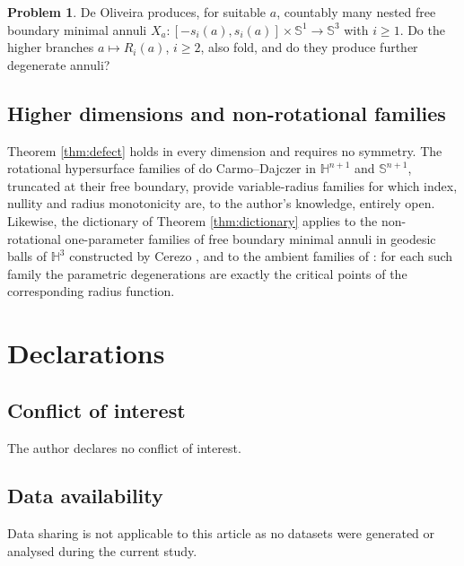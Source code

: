 \documentclass[11pt,a4paper]{amsart}
\theoremstyle{plain}
\theoremstyle{definition}
\newtheorem{problem}[theorem]{Problem}
\newcommand{\Sph}{\mathbb{S}}
\newcommand{\Hyp}{\mathbb{H}}
\begin{document}
\begin{problem}\label{prob:otherbranches}
De Oliveira \cite[Thm. 3.2]{dO24} produces, for suitable $a$, countably many nested free boundary minimal annuli $X_a:[-s_i(a),s_i(a)]\times\Sph^1\to\Sph^3$ with $i\geq 1$. Do the higher branches $a\mapsto R_i(a)$, $i\geq 2$, also fold, and do they produce further degenerate annuli?
\end{problem}

\subsection*{Higher dimensions and non-rotational families}

Theorem \ref{thm:defect} holds in every dimension and requires no symmetry. The rotational hypersurface families of do Carmo--Dajczer \cite{dCD83} in $\Hyp^{n+1}$ and $\Sph^{n+1}$, truncated at their free boundary, provide variable-radius families for which index, nullity and radius monotonicity are, to the author's knowledge, entirely open. Likewise, the dictionary of Theorem \ref{thm:dictionary} applies to the non-rotational one-parameter families of free boundary minimal annuli in geodesic balls of $\Hyp^3$ constructed by Cerezo \cite{Cer25}, and to the ambient families of \cite{CFM25,FHM23}: for each such family the parametric degenerations are exactly the critical points of the corresponding radius function.

\section*{Declarations}

\subsection*{Conflict of interest}

The author declares no conflict of interest.

\subsection*{Data availability}

Data sharing is not applicable to this article as no datasets were generated or analysed during the current study.
\end{document}

